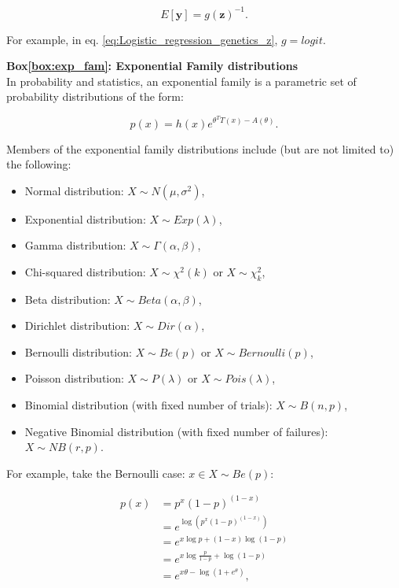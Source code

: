 \begin{equation*}
 E[\mathbf{y}] = g(\mathbf{z})^{-1}. 
\end{equation*}

For example, in eq. \eqref{eq:Logistic_regression_genetics_z}, $ g = logit $.



\newpage

\begin{Comment}
\hspace{-2.5mm}\textbf{Box\ref{box:exp_fam}: Exponential Family distributions}\label{box:exp_fam}\\
In probability and statistics, an exponential family is a parametric set of probability distributions of the form:

\begin{equation*}
    p(x) = h(x)e^{\theta^TT(x)-A(\theta)}.
\end{equation*}

Members of the exponential family distributions include (but are not limited to) the following:
\begin{itemize}
    \item Normal distribution: $X \sim N(\mu,\sigma^2)$,
    \item Exponential distribution: $ X \sim Exp(\lambda)$,
    \item Gamma distribution: $ X \sim \Gamma(\alpha,\beta)$,
    \item Chi-squared distribution: $ X \sim \chi^2 (k)$ or $ X \sim \chi_k^2$,
    \item Beta distribution: $ X \sim Beta(\alpha,\beta)$,
    \item Dirichlet distribution: $ X \sim Dir(\alpha)$,
    \item Bernoulli distribution: $ X \sim Be(p)$ or $ X \sim Bernoulli(p)$,
    \item Poisson distribution: $ X \sim P(\lambda)$ or $ X \sim Pois(\lambda)$,
    \item Binomial distribution (with fixed number of trials): $ X \sim B(n,p)$,
    \item Negative Binomial distribution (with fixed number of failures): $ X \sim NB(r,p)$.\\
\end{itemize}

For example, take the Bernoulli case: $x \in X \sim Be(p)$:

\begin{equation*}
\begin{split}
    p(x) & = p^x(1-p)^{(1-x)}\\
         & = e^{\log (p^x(1-p)^{(1-x)})}\\
         & = e^{x\log p + (1-x)\log (1-p)}\\
         & = e^{x\log \frac{p}{1-p}+\log (1-p)}\\
         & = e^{x\theta - \log (1+e^\theta)},
\end{split}
\end{equation*}


\end{Comment}
